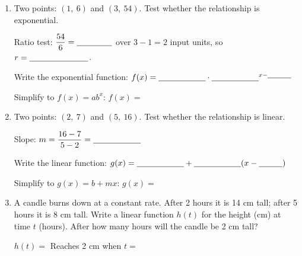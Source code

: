 \documentclass[10pt]{article}
\begin{document}
\vspace{0.08in}

\begin{tcolorbox}[colback=white, colframe=black!40,
    title=\textbf{Tier A --- Apply},
    fonttitle=\bfseries, arc=2mm, left=3mm, right=3mm, top=2mm, bottom=2mm]

\begin{enumerate}[itemsep=10pt]
  \item Two points: $(1,\ 6)$ and $(3,\ 54)$. Test whether the relationship is exponential.

        \vspace{0.06in}
        Ratio test: $\dfrac{54}{6} = \blank{1.5cm}$ over $3 - 1 = 2$ input units,
        so $r = \blank{2.5cm}$.

        Write the exponential function: $f(x) = \blank{2cm} \cdot \blank{2cm}^{x - \blank{1cm}}$

        \vspace{0.04in}
        Simplify to $f(x) = ab^x$: $f(x) = $ \blank{5cm}

  \item Two points: $(2,\ 7)$ and $(5,\ 16)$. Test whether the relationship is linear.

        \vspace{0.06in}
        Slope: $m = \dfrac{16 - 7}{5 - 2} = \blank{2cm}$

        Write the linear function: $g(x) = \blank{2cm} + \blank{2cm}(x - \blank{1cm})$

        \vspace{0.04in}
        Simplify to $g(x) = b + mx$: $g(x) = $ \blank{5cm}

  \item A candle burns down at a constant rate. After 2 hours it is 14 cm tall; after 5 hours it
        is 8 cm tall. Write a linear function $h(t)$ for the height (cm) at time $t$ (hours).
        After how many hours will the candle be 2 cm tall?

        \vspace{0.06in}
        $h(t) = $ \blank{5cm} \quad Reaches 2 cm when $t = $ \blank{2.5cm}
\end{enumerate}
\end{tcolorbox}

\vspace{0.08in}
\end{document}
